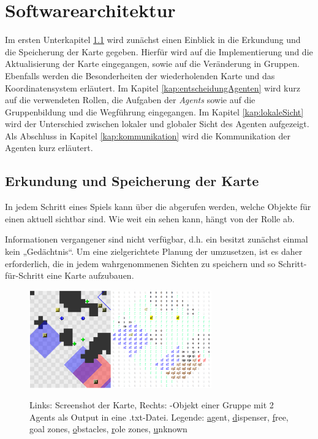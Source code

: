 \section{Softwarearchitektur}

Im ersten Unterkapitel \ref{erkundungDerKarte} wird zunächst einen Einblick in die Erkundung und die Speicherung der Karte gegeben. Hierfür wird auf die Implementierung und die Aktualisierung der Karte eingegangen, sowie auf die Veränderung in Gruppen. Ebenfalls werden die Besonderheiten der wiederholenden Karte und das Koordinatensystem erläutert. Im Kapitel \ref{kap:entscheidungAgenten} wird kurz auf die verwendeten Rollen, die Aufgaben der \textit{Agents} sowie auf die Gruppenbildung und die Wegführung eingegangen. Im Kapitel \ref{kap:lokaleSicht} wird der Unterschied zwischen lokaler und globaler Sicht des Agenten aufgezeigt. Als Abschluss in Kapitel \ref{kap:kommunikation} wird die Kommunikation der Agenten kurz erläutert.

\subsection{Erkundung und Speicherung der Karte} \label{erkundungDerKarte}

In jedem Schritt eines Spiels kann über die \Percepts abgerufen werden, welche Objekte für einen \Agent aktuell sichtbar sind. Wie weit ein \Agent sehen kann, hängt von der Rolle ab.

Informationen vergangener \Percepts sind nicht verfügbar, d.h. ein \Agent besitzt zunächst einmal kein „Gedächtnis“. Um eine zielgerichtete Planung der \Agents umzusetzen, ist es daher erforderlich, die in jedem \Step wahrgenommenen Sichten zu speichern und so Schritt-für-Schritt eine Karte aufzubauen. \\

\begin{figure}[h]
	\includegraphics[width=0.7\textwidth]{./Abbildungen/map.png}
	\centering
	\label{fig:interneKarte}
	\caption{Links: Screenshot der Karte, Rechts: \NextMap-Objekt einer Gruppe mit 2 Agents als Output in eine .txt-Datei. \newline Legende: \underline{a}gent, \underline{d}ispenser, \underline{f}ree, \underline{g}oal zones, \underline{o}bstacles, \underline{r}ole zones, \underline{u}nknown}
\end{figure} 

